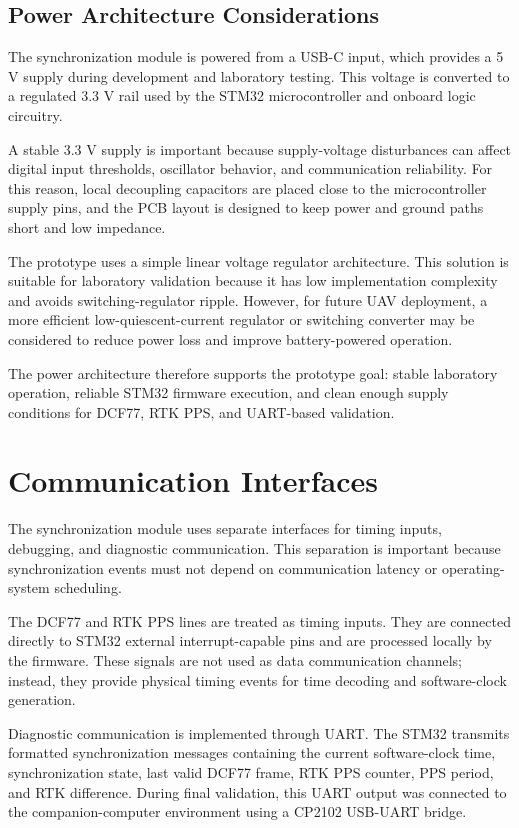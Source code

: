 \subsection{Power Architecture Considerations}

The synchronization module is powered from a USB-C input, which provides a 5 V supply during development and laboratory testing. This voltage is converted to a regulated 3.3 V rail used by the STM32 microcontroller and onboard logic circuitry.

A stable 3.3 V supply is important because supply-voltage disturbances can affect digital input thresholds, oscillator behavior, and communication reliability. For this reason, local decoupling capacitors are placed close to the microcontroller supply pins, and the PCB layout is designed to keep power and ground paths short and low impedance.

The prototype uses a simple linear voltage regulator architecture. This solution is suitable for laboratory validation because it has low implementation complexity and avoids switching-regulator ripple. However, for future UAV deployment, a more efficient low-quiescent-current regulator or switching converter may be considered to reduce power loss and improve battery-powered operation.

The power architecture therefore supports the prototype goal: stable laboratory operation, reliable STM32 firmware execution, and clean enough supply conditions for DCF77, RTK PPS, and UART-based validation.

\section{Communication Interfaces}

The synchronization module uses separate interfaces for timing inputs, debugging, and diagnostic communication. This separation is important because synchronization events must not depend on communication latency or operating-system scheduling.

The DCF77 and RTK PPS lines are treated as timing inputs. They are connected directly to STM32 external interrupt-capable pins and are processed locally by the firmware. These signals are not used as data communication channels; instead, they provide physical timing events for time decoding and software-clock generation.

Diagnostic communication is implemented through UART. The STM32 transmits formatted synchronization messages containing the current software-clock time, synchronization state, last valid DCF77 frame, RTK PPS counter, PPS period, and RTK difference. During final validation, this UART output was connected to the companion-computer environment using a CP2102 USB-UART bridge.

